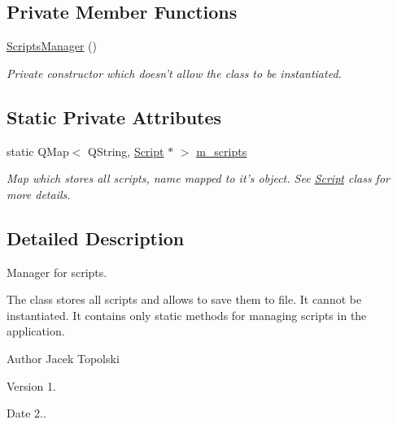 \subsection*{Private Member Functions}
\begin{DoxyCompactItemize}
\item 
\hyperlink{class_scripts_manager_a6c0f74bb1ba41b0c29f388fc9b973489}{Scripts\-Manager} ()
\begin{DoxyCompactList}\small\item\em Private constructor which doesn't allow the class to be instantiated. \end{DoxyCompactList}\end{DoxyCompactItemize}
\subsection*{Static Private Attributes}
\begin{DoxyCompactItemize}
\item 
static Q\-Map$<$ Q\-String, \hyperlink{class_script}{Script} $\ast$ $>$ \hyperlink{class_scripts_manager_adcf2fffc60140c92bbca764602f322aa}{m\-\_\-scripts}
\begin{DoxyCompactList}\small\item\em Map which stores all scripts, name mapped to it's object. See \hyperlink{class_script}{Script} class for more details. \end{DoxyCompactList}\end{DoxyCompactItemize}


\subsection{Detailed Description}
Manager for scripts. 

The class stores all scripts and allows to save them to file. It cannot be instantiated. It contains only static methods for managing scripts in the application. \begin{DoxyAuthor}{Author}
Jacek Topolski 
\end{DoxyAuthor}
\begin{DoxyVersion}{Version}
1. 
\end{DoxyVersion}
\begin{DoxyDate}{Date}
2.. 
\end{DoxyDate}


